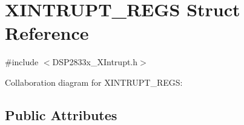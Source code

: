 \hypertarget{struct_x_i_n_t_r_u_p_t___r_e_g_s}{}\section{X\+I\+N\+T\+R\+U\+P\+T\+\_\+\+R\+E\+G\+S Struct Reference}
\label{struct_x_i_n_t_r_u_p_t___r_e_g_s}


{\ttfamily \#include $<$D\+S\+P2833x\+\_\+\+X\+Intrupt.\+h$>$}



Collaboration diagram for X\+I\+N\+T\+R\+U\+P\+T\+\_\+\+R\+E\+G\+S\+:
\subsection*{Public Attributes}
